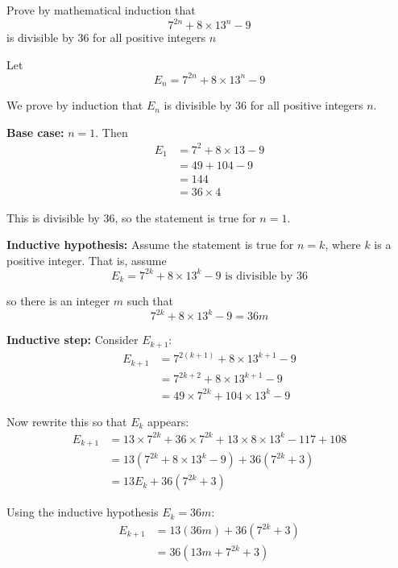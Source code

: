 \documentclass[leqno]{article}
\begin{document}
\begin{enumerate}[
  label=\textbf{\arabic*.},
  leftmargin=*,
  topsep=0pt,
  partopsep=0pt,
  parsep=0pt
]
\newpage

\questionitem

Prove by mathematical induction that
\[
7^{2n}+8\times 13^n-9
\]
is divisible by $36$ for all positive integers $n$ 

\vspace*{10pt}

\begin{djsSolution}
Let
\[
E_n=7^{2n}+8\times 13^n-9
\]

We prove by induction that \(E_n\) is divisible by \(36\) for all positive integers \(n\).

\textbf{Base case:} \(n=1\). Then
\begin{align*}
E_1&=7^2+8\times 13-9\\
&=49+104-9\\
&=144\\
&=36\times 4
\end{align*}

This is divisible by \(36\), so the statement is true for \(n=1\).

\textbf{Inductive hypothesis:} Assume the statement is true for \(n=k\), where \(k\) is a positive integer. That is, assume
\[
E_k=7^{2k}+8\times 13^k-9 \text{ is divisible by } 36
\]

so there is an integer \(m\) such that
\[
7^{2k}+8\times 13^k-9=36m
\]

\textbf{Inductive step:} Consider \(E_{k+1}\):
\begin{align*}
E_{k+1}
&=7^{2(k+1)}+8\times 13^{k+1}-9\\
&=7^{2k+2}+8\times 13^{k+1}-9\\
&=49\times 7^{2k}+104\times 13^k-9
\end{align*}

Now rewrite this so that \(E_k\) appears:
\begin{align*}
E_{k+1}
&=13\times 7^{2k}+36\times 7^{2k}+13\times 8\times 13^k-117+108\\
&=13\left(7^{2k}+8\times 13^k-9\right)+36\left(7^{2k}+3\right)\\
&=13E_k+36\left(7^{2k}+3\right)
\end{align*}

Using the inductive hypothesis \(E_k=36m\):
\begin{align*}
E_{k+1}
&=13(36m)+36\left(7^{2k}+3\right)\\
&=36\left(13m+7^{2k}+3\right)
\end{align*}


\end{djsSolution}
\end{enumerate}
\end{document}
